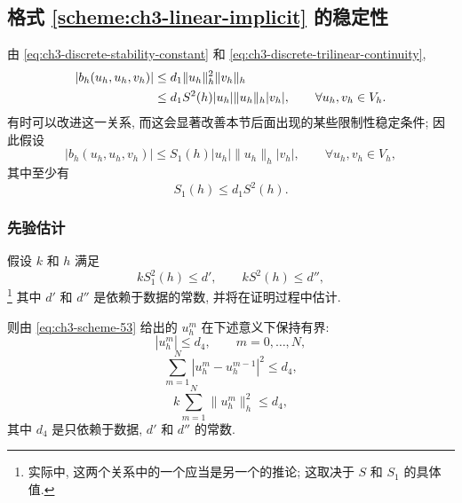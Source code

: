 \subsection{格式 \ref{scheme:ch3-linear-implicit} 的稳定性}
\label{subsec:ch3-scheme-53-stability}

由 \eqref{eq:ch3-discrete-stability-constant} 和 \eqref{eq:ch3-discrete-trilinear-continuity},
\begin{align}
|b_h(u_h,u_h,v_h)|
&\leq d_1\lVert u_h\rVert_h^2\lVert v_h\rVert_h\notag\\
&\leq d_1S^2(h)|u_h|\lVert u_h\rVert_h|v_h|,
\qquad\forall u_h,v_h\in V_h.
\label{eq:ch3-scheme-53-basic-trilinear-bound}
\end{align}
有时可以改进这一关系, 而这会显著改善本节后面出现的某些限制性稳定条件; 因此假设
\begin{equation}
|b_h(u_h,u_h,v_h)|\leq S_1(h)|u_h|\lVert u_h\rVert_h|v_h|,
\qquad\forall u_h,v_h\in V_h,
\label{eq:ch3-scheme-53-improved-trilinear-bound}
\end{equation}
其中至少有
\begin{equation}
S_1(h)\leq d_1S^2(h).
\label{eq:ch3-scheme-53-s1-bound}
\end{equation}

\hypertarget{chapter-03-page-246}{}
\subsubsection{先验估计}
\label{subsubsec:ch3-scheme-53-apriori-estimates}

\begin{Lemma}
\label{lem:ch3-scheme-53-apriori-bounds}
假设 $k$ 和 $h$ 满足
\begin{equation}
kS_1^2(h)\leq d',
\qquad kS^2(h)\leq d'',
\label{eq:ch3-scheme-53-stability-conditions}
\end{equation}
\footnote{实际中, 这两个关系中的一个应当是另一个的推论; 这取决于 $S$ 和 $S_1$ 的具体值.}
其中 $d'$ 和 $d''$ 是依赖于数据的常数, 并将在证明过程中估计.

则由 \eqref{eq:ch3-scheme-53} 给出的 $u_h^m$ 在下述意义下保持有界:
\begin{equation}
|u_h^m|\leq d_4,
\qquad m=0,\ldots,N,
\label{eq:ch3-scheme-53-uniform-bound}
\end{equation}
\begin{equation}
\sum_{m=1}^N|u_h^m-u_h^{m-1}|^2\leq d_4,
\label{eq:ch3-scheme-53-increment-bound}
\end{equation}
\begin{equation}
k\sum_{m=1}^N\lVert u_h^m\rVert_h^2\leq d_4,
\label{eq:ch3-scheme-53-energy-bound}
\end{equation}
其中 $d_4$ 是只依赖于数据, $d'$ 和 $d''$ 的常数.
\end{Lemma}

